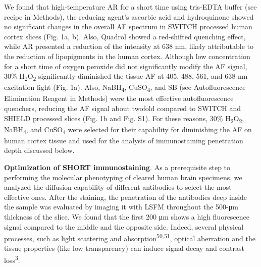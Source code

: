 \documentclass{article}
\begin{document}
We found that high-temperature AR for a short time using tris-EDTA buffer (see recipe in Methods), the reducing agent’s ascorbic acid and hydroquinone showed no significant changes in the overall AF spectrum in SWITCH processed human cortex slices (Fig. 1a, b). Also, Quadrol showed a red-shifted quenching effect, while AR presented a reduction of the intensity at 638 nm, likely attributable to the reduction of lipopigments in the human cortex. Although low concentration for a short time of oxygen peroxide did not significantly modify the AF signal, 30\% H\textsubscript{2}O\textsubscript{2} significantly diminished the tissue AF at 405, 488, 561, and 638 nm excitation light (Fig. 1a). Also, NaBH\textsubscript{4}, CuSO\textsubscript{4}, and SB (see Autofluorescence Elimination Reagent in Methods) were the most effective autofluorescence quenchers, reducing the AF signal about twofold compared to SWITCH and SHIELD processed slices (Fig. 1b and Fig. S1). For these reasons, 30\% H\textsubscript{2}O\textsubscript{2}, NaBH\textsubscript{4}, and CuSO\textsubscript{4} were selected for their capability for diminishing the AF on human cortex tissue and used for the analysis of immunostaining penetration depth discussed below.

\textbf{Optimization of SHORT immunostaining}. As a prerequisite step to performing the molecular phenotyping of cleared human brain specimens, we analyzed the diffusion capability of different antibodies to select the most effective ones. After the staining, the penetration of the antibodies deep inside the sample was evaluated by imaging it with LSFM throughout the 500-μm thickness of the slice. We found that the first 200 μm shows a high fluorescence signal compared to the middle and the opposite side. Indeed, several physical processes, such as light scattering and absorption\textsuperscript{50,51}, optical aberration and the tissue properties (like low transparency) can induce signal decay and contrast loss\textsuperscript{3}.
\end{document}
